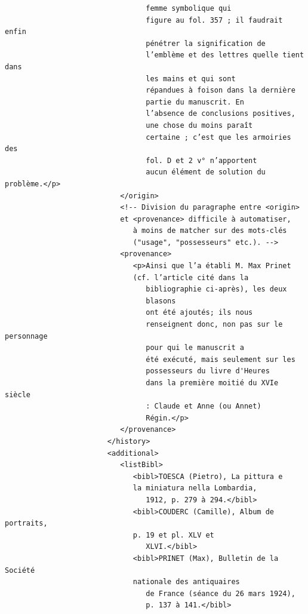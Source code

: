 \documentclass[a4paper,12pt,twoside]{book}
\begin{document}
\begin{verbatim}
                                 femme symbolique qui
                                 figure au fol. 357 ; il faudrait enfin
                                 pénétrer la signification de
                                 l’emblème et des lettres quelle tient dans
                                 les mains et qui sont
                                 répandues à foison dans la dernière 
                                 partie du manuscrit. En
                                 l’absence de conclusions positives, 
                                 une chose du moins paraît
                                 certaine ; c’est que les armoiries des 
                                 fol. D et 2 v° n’apportent
                                 aucun élément de solution du problème.</p>
                           </origin>
                           <!-- Division du paragraphe entre <origin> 
                           et <provenance> difficile à automatiser, 
                              à moins de matcher sur des mots-clés 
                              ("usage", "possesseurs" etc.). -->
                           <provenance>
                              <p>Ainsi que l’a établi M. Max Prinet 
                              (cf. l’article cité dans la
                                 bibliographie ci-après), les deux 
                                 blasons
                                 ont été ajoutés; ils nous
                                 renseignent donc, non pas sur le personnage
                                 pour qui le manuscrit a
                                 été exécuté, mais seulement sur les 
                                 possesseurs du livre d'Heures
                                 dans la première moitié du XVIe siècle
                                 : Claude et Anne (ou Annet)
                                 Régin.</p>
                           </provenance>
                        </history>
                        <additional>
                           <listBibl>
                              <bibl>TOESCA (Pietro), La pittura e 
                              la miniatura nella Lombardia,
                                 1912, p. 279 à 294.</bibl>
                              <bibl>COUDERC (Camille), Album de portraits,
                              p. 19 et pl. XLV et
                                 XLVI.</bibl>
                              <bibl>PRINET (Max), Bulletin de la Société
                              nationale des antiquaires
                                 de France (séance du 26 mars 1924), 
                                 p. 137 à 141.</bibl>

\end{verbatim}
\end{document}
